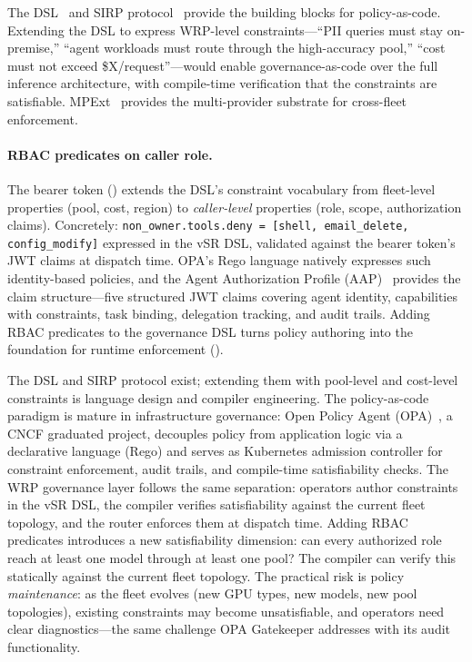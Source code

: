 \begin{opportunity}
\label{opp:governance}
The \vsr{} DSL~\cite{vllmsr2026} and SIRP
protocol~\cite{sirp2025} provide the building blocks for
policy-as-code.  Extending the DSL to express WRP-level
constraints---``PII queries must stay on-premise,'' ``agent
workloads must route through the high-accuracy pool,'' ``cost
must not exceed \$X/request''---would enable governance-as-code
over the full inference architecture, with compile-time
verification that the constraints are satisfiable.
MPExt~\cite{mpext2025} provides the multi-provider substrate for
cross-fleet enforcement.

\paragraph{RBAC predicates on caller role.}
The bearer token () extends the DSL's
constraint vocabulary from fleet-level properties (pool, cost,
region) to \emph{caller-level} properties (role, scope,
authorization claims).  Concretely:
\texttt{non\_owner.tools.deny~=~[shell, email\_delete,
config\_modify]} expressed in the vSR DSL, validated against the
bearer token's JWT claims at dispatch time.  OPA's Rego language
natively expresses such identity-based policies, and the Agent
Authorization Profile (AAP)~\cite{aap2026} provides the claim
structure---five structured JWT claims covering agent identity,
capabilities with constraints, task binding, delegation tracking, and
audit trails.  Adding RBAC predicates to the governance DSL turns
policy authoring into the foundation for runtime enforcement
().

\begin{frisk}
The DSL and SIRP protocol exist; extending them with pool-level
and cost-level constraints is language design and compiler
engineering.  The policy-as-code paradigm is mature in
infrastructure governance: Open Policy Agent
(OPA)~\cite{openpolicyagent}, a CNCF graduated project, decouples
policy from application logic via a declarative language (Rego) and
serves as Kubernetes admission controller for constraint
enforcement, audit trails, and compile-time satisfiability checks.
The WRP governance layer follows the same separation:
operators author constraints in the vSR DSL, the compiler verifies
satisfiability against the current fleet topology, and the router
enforces them at dispatch time.  Adding RBAC predicates introduces a
new satisfiability dimension: can every authorized role reach at least
one model through at least one pool?  The compiler can verify this
statically against the current fleet topology.  The practical risk is
policy \emph{maintenance}: as the fleet evolves (new GPU types, new
models, new pool topologies), existing constraints may become
unsatisfiable, and operators need clear diagnostics---the same
challenge OPA Gatekeeper addresses with its audit functionality.
\end{frisk}
\end{opportunity}


